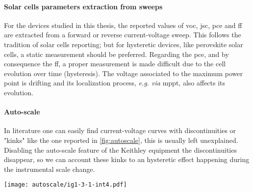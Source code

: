 	\paragraph{Solar cells parameters extraction from sweeps}
	For the devices studied in this thesis, the reported values of \gls{voc}, \gls{jsc}, \gls{pce} and \gls{ff} are extracted from a forward or reverse current-voltage sweep.
	This follows the tradition of solar cells reporting; but for hysteretic devices, like perovskite solar cells, a static measurement should be preferred.
	Regarding the \gls{pce}, and by consequence the \gls{ff}, a proper measurement is made difficult due to the cell evolution over time (hysteresis).
	The voltage associated to the maximum power point is drifting and its localization process, \textsl{e.g. via} \gls{mppt}, also affects its evolution.

	\paragraph{Auto-scale}\label{autoscale}
	In literature one can easily find current-voltage curves with discontinuities or "kinks" \cite{Li2016,Snaith2014,Zhang2015} like the one reported in \cref{fig:autoscale}, this is usually left unexplained.
	Disabling the auto-scale feature of the Keithley equipment the discontinuities disappear, so we can account these kinks to an hysteretic effect happening during the instrumental scale change.

	\begin{SCfigure}%
		\centering
		\texttt{[image: autoscale/ig1-3-1-int4.pdf]}
		\label{fig:autoscale}
	\end{SCfigure}

